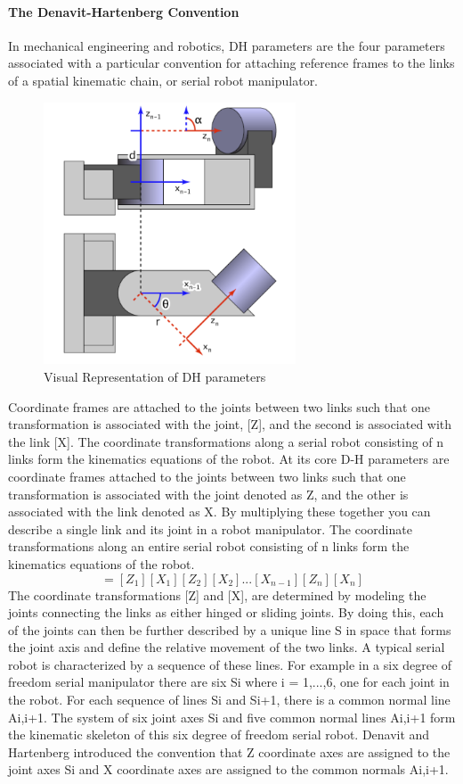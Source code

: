     \paragraph{The Denavit-Hartenberg Convention}
    In mechanical engineering and robotics, DH parameters are the four parameters associated with a particular convention for attaching reference frames to the links of a spatial kinematic chain, or serial robot manipulator.
     \begin{figure}[H]
        \centering
        \includegraphics[width=75mm]{Dh.PNG}
        \caption{Visual Representation of DH parameters}
        \label{fig:my_label}
    \end{figure}
    Coordinate frames are attached to the joints between two links such that one transformation is associated with the joint, [Z], and the second is associated with the link [X]. The coordinate transformations along a serial robot consisting of n links form the kinematics equations of the robot. At its core D-H parameters are coordinate frames attached to the joints between two links such that one transformation is associated with the joint denoted as Z, and the other is associated with the link denoted as X. By multiplying these together you can describe a single link and its joint in a robot manipulator. The coordinate transformations along an entire serial robot consisting of n links form the kinematics equations of the robot.
    \begin{equation}
    [T] = [Z_1][X_1][Z_2][X_2]...[X_{n-1}][Z_n][X_n]
    \end{equation}
    The coordinate transformations [Z] and [X], are determined by modeling the joints connecting the links as either hinged or sliding joints. By doing this, each of the joints can then be further described by a unique line S in space that forms the joint axis and define the relative movement of the two links. A typical serial robot is characterized by a sequence of these lines. For example in a six degree of freedom serial manipulator there are six Si where i = 1,...,6, one for each joint in the robot. For each sequence of lines Si and Si+1, there is a common normal line Ai,i+1. The system of six joint axes Si and five common normal lines Ai,i+1 form the kinematic skeleton of this six degree of freedom serial robot. Denavit and Hartenberg introduced the convention that Z coordinate axes are assigned to the joint axes Si and X coordinate axes are assigned to the common normals Ai,i+1.

